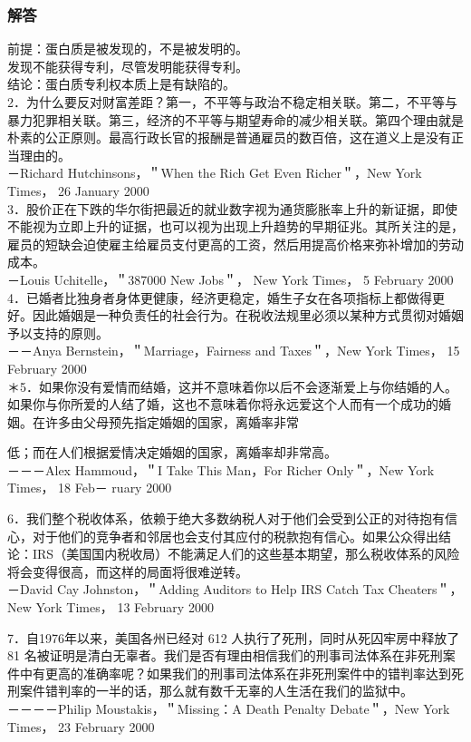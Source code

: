 \subsubsection{解答}
前提：蛋白质是被发现的，不是被发明的。\\
发现不能获得专利，尽管发明能获得专利。\\
结论：蛋白质专利权本质上是有缺陷的。\\
2．为什么要反对财富差距？第一，不平等与政治不稳定相关联。第二，不平等与暴力犯罪相关联。第三，经济的不平等与期望寿命的减少相关联。第四个理由就是朴素的公正原则。最高行政长官的报酬是普通雇员的数百倍，这在道义上是没有正当理由的。\\
－Richard Hutchinsons，＂When the Rich Get Even Richer＂，New York Times， 26 January 2000\\
3．股价正在下跌的华尔街把最近的就业数字视为通货膨胀率上升的新证据，即使不能视为立即上升的证据，也可以视为出现上升趋势的早期征兆。其所关注的是，雇员的短缺会迫使雇主给雇员支付更高的工资，然后用提高价格来弥补增加的劳动成本。\\
－Louis Uchitelle，＂387000 New Jobs＂， New York Times， 5 February 2000\\
4．已婚者比独身者身体更健康，经济更稳定，婚生子女在各项指标上都做得更好。因此婚姻是一种负责任的社会行为。在税收法规里必须以某种方式贯彻对婚姻予以支持的原则。\\
－－Anya Bernstein，＂Marriage，Fairness and Taxes＂，New York Times， 15 February 2000\\
＊5．如果你没有爱情而结婚，这并不意味着你以后不会逐渐爱上与你结婚的人。如果你与你所爱的人结了婚，这也不意味着你将永远爱这个人而有一个成功的婚姻。在许多由父母预先指定婚姻的国家，离婚率非常

低；而在人们根据爱情决定婚姻的国家，离婚率却非常高。\\
－－－Alex Hammoud，＂I Take This Man，For Richer Only＂，New York Times， 18 Feb－ ruary 2000

6．我们整个税收体系，依赖于绝大多数纳税人对于他们会受到公正的对待抱有信心，对于他们的竞争者和邻居也会支付其应付的税款抱有信心。如果公众得出结论：IRS（美国国内税收局）不能满足人们的这些基本期望，那么税收体系的风险将会变得很高，而这样的局面将很难逆转。\\
－David Cay Johnston，＂Adding Auditors to Help IRS Catch Tax Cheaters＂，New York Times， 13 February 2000

7．自1976年以来，美国各州已经对 612 人执行了死刑，同时从死囚牢房中释放了 81 名被证明是清白无辜者。我们是否有理由相信我们的刑事司法体系在非死刑案件中有更高的准确率呢？如果我们的刑事司法体系在非死刑案件中的错判率达到死刑案件错判率的一半的话，那么就有数千无辜的人生活在我们的监狱中。\\
－－－－Philip Moustakis，＂Missing：A Death Penalty Debate＂，New York Times， 23 February 2000


